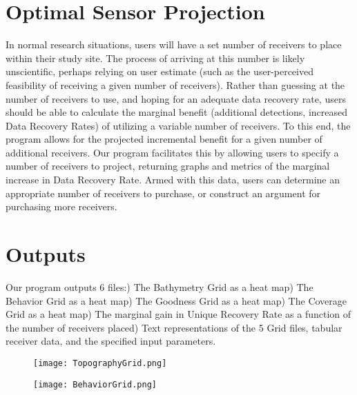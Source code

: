 \section{Optimal Sensor Projection}
In normal research situations, users will have a set number of receivers to place within their study site.  The process of arriving at this number is likely unscientific, perhaps relying on user estimate (such as the user-perceived feasibility of receiving a given number of receivers).  Rather than guessing at the number of receivers to use, and hoping for an adequate data recovery rate, users should be able to calculate the marginal benefit (additional detections, increased Data Recovery Rates) of utilizing a variable number of receivers.   To this end, the program allows for the projected incremental benefit for a given number of additional receivers.  Our program facilitates this by allowing users to specify a number of receivers to project, returning graphs and metrics of the marginal increase in Data Recovery Rate.  Armed with this data, users can determine an appropriate number of receivers to purchase, or construct an argument for purchasing more receivers.

\section{Outputs}
Our program outputs 6 files:) The Bathymetry Grid as a heat map) The Behavior Grid as a heat map) The Goodness Grid as a heat map) The Coverage Grid as a heat map) The marginal gain in Unique Recovery Rate as a function of the number of receivers placed) Text representations of the 5 Grid files, tabular receiver data, and the specified input parameters.\newline
\begin{figure}[h!]
	\label{outputGraphs}
		\texttt{[image: TopographyGrid.png]}
		\caption{}\label{bathyGraph}
	\end{figure}
	
	\begin{figure}[t]
		\texttt{[image: BehaviorGrid.png]}
		\caption{}\label{animalGraph}
	\end{figure}
	

